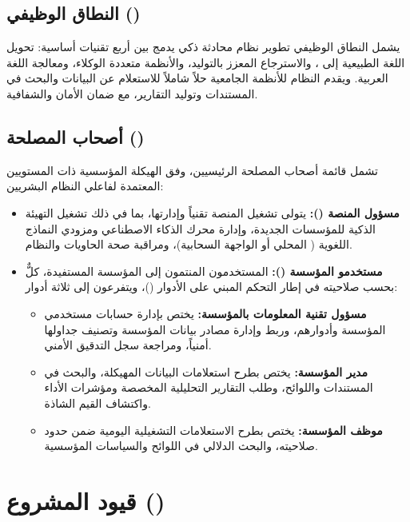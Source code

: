 \subsection{النطاق الوظيفي ()}
يشمل النطاق الوظيفي تطوير نظام محادثة ذكي يدمج بين أربع تقنيات أساسية:
تحويل اللغة الطبيعية إلى ، والاسترجاع المعزز بالتوليد، والأنظمة
متعددة الوكلاء، ومعالجة اللغة العربية. ويقدم النظام للأنظمة الجامعية حلاً
شاملاً للاستعلام عن البيانات والبحث في المستندات وتوليد التقارير، مع ضمان
الأمان والشفافية.

\subsection{أصحاب المصلحة ()}
تشمل قائمة أصحاب المصلحة الرئيسيين، وفق الهيكلة المؤسسية ذات المستويين
المعتمدة لفاعلي النظام البشريين:
\begin{itemize}
  \item \textbf{مسؤول المنصة ():} يتولى تشغيل
        المنصة تقنياً وإدارتها، بما في ذلك تشغيل التهيئة الذكية للمؤسسات
        الجديدة، وإدارة محرك الذكاء الاصطناعي ومزودي النماذج اللغوية
        ( المحلي أو الواجهة السحابية)، ومراقبة صحة الحاويات
        والنظام.
  \item \textbf{مستخدمو المؤسسة ():} المستخدمون
        المنتمون إلى المؤسسة المستفيدة، كلٌّ بحسب صلاحيته في إطار التحكم
        المبني على الأدوار ()، ويتفرعون إلى ثلاثة أدوار:
  \begin{itemize}
    \item \textbf{مسؤول تقنية المعلومات بالمؤسسة:} يختص بإدارة حسابات
          مستخدمي المؤسسة وأدوارهم، وربط وإدارة مصادر بيانات المؤسسة
          وتصنيف جداولها أمنياً، ومراجعة سجل التدقيق الأمني.
    \item \textbf{مدير المؤسسة:} يختص بطرح استعلامات البيانات المهيكلة،
          والبحث في المستندات واللوائح، وطلب التقارير التحليلية المخصصة
          ومؤشرات الأداء واكتشاف القيم الشاذة.
    \item \textbf{موظف المؤسسة:} يختص بطرح الاستعلامات التشغيلية اليومية
          ضمن حدود صلاحيته، والبحث الدلالي في اللوائح والسياسات المؤسسية.
  \end{itemize}
\end{itemize}

\section{قيود المشروع ()}
\label{sec:limitations}

